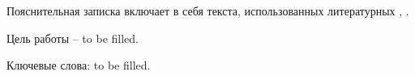 {
\thispagestyle{empty}
Пояснительная записка включает в себя
 текста,
 использованных литературных
,
. 

Цель работы -- to be filled.

Ключевые слова: to be filled.

\newpage
}